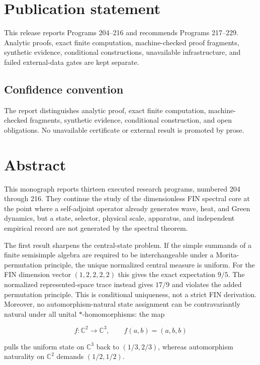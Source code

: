 \documentclass[11pt,a4paper,openany]{report}
\begin{document}
\chapter*{Publication statement}
This release reports Programs 204--216 and recommends Programs 217--229.
Analytic proofs, exact finite computation, machine-checked proof fragments,
synthetic evidence, conditional constructions, unavailable infrastructure,
and failed external-data gates are kept separate.

\tableofcontents
\clearpage
{}

\section{Confidence convention}

The report distinguishes analytic proof, exact finite computation, machine-checked fragments, synthetic evidence, conditional construction, and open obligations. No unavailable certificate or external result is promoted by prose.

\chapter{Abstract}

This monograph reports thirteen executed research programs, numbered 204 through 216. They continue the study of the dimensionless FIN spectral core at the point where a self-adjoint operator already generates wave, heat, and Green dynamics, but a state, selector, physical scale, apparatus, and independent empirical record are not generated by the spectral theorem.

The first result sharpens the central-state problem. If the simple summands of a finite semisimple algebra are required to be interchangeable under a Morita-permutation principle, the unique normalized central measure is uniform. For the FIN dimension vector \((1,2,2,2,2)\) this gives the exact expectation \(9/5\). The normalized represented-space trace instead gives \(17/9\) and violates the added permutation principle. This is conditional uniqueness, not a strict FIN derivation. Moreover, no automorphism-natural state assignment can be contravariantly natural under all unital \(*\)-homomorphisms: the map

\[
f:\mathbb C^2\longrightarrow\mathbb C^3,
\qquad
f(a,b)=(a,b,b)
\]

pulls the uniform state on \(\mathbb C^3\) back to \((1/3,2/3)\), whereas automorphism naturality on \(\mathbb C^2\) demands \((1/2,1/2)\).
\end{document}
